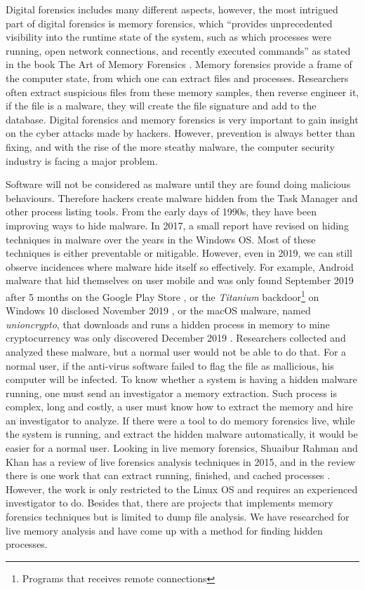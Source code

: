 Digital forensics includes many different aspects, however, the most intrigued part of digital forensics is memory forensics, which ``provides unprecedented visibility into the runtime state of the system, such as which processes were running, open network connections, and recently executed commands'' as stated in the book The Art of Memory Forensics \cite{ligh2014art}. Memory forensics provide a frame of the computer state, from which one can extract files and processes. Researchers often extract suspicious files from these memory samples, then reverse engineer it, if the file is a malware, they will create the file signature and add to the database. Digital forensics and memory forensics is very important to gain insight on the cyber attacks made by hackers. However, prevention is always better than fixing, and with the rise of the more steathy malware, the computer security industry is facing a major problem.

Software will not be considered as malware until they are found doing malicious behaviours. Therefore hackers create malware hidden from the Task Manager and other process listing tools. From the early days of 1990s, they have been improving ways to hide malware. In 2017, a small report \cite{evolutionHidding} have revised on hiding techniques in malware over the years in the Windows OS. Most of these techniques is either preventable or mitigable. However, even in 2019, we can still observe incidences where malware hide itself so effectively. For example, Android malware that hid themselves on user mobile and was only found September 2019 after 5 months on the Google Play Store \cite{hiddenMalwareAndroid}, or the \textit{Titanium} backdoor\footnote{Programs that receives remote connections} on Windows 10 disclosed November 2019 \cite{titanium}, or the macOS malware, named \textit{unioncrypto}, that downloads and runs a hidden process in memory to mine cryptocurrency was only discovered December 2019 \cite{unioncrypto}. Researchers collected and analyzed these malware, but a normal user would not be able to do that. For a normal user, if the anti-virus software failed to flag the file as mallicious, his computer will be infected. To know whether a system is having a hidden malware running, one must send an investigator a memory extraction. Such process is complex, long and costly, a user must know how to extract the memory and hire an investigator to analyze. If there were a tool to do memory forensics live, while the system is running, and extract the hidden malware automatically, it would be easier for a normal user. Looking in live memory forensics, Shuaibur Rahman and Khan \cite{reviewLive} has a review of live forensics analysis techniques in 2015, and in the review there is one work that can extract running, finished, and cached processes \cite{comparativeLive}. However, the work is only restricted to the Linux OS and requires an experienced investigator to do. Besides that, there are projects that implements memory forensics techniques but is limited to dump file analysis. We have researched for live memory analysis and have come up with a method for finding hidden processes.

